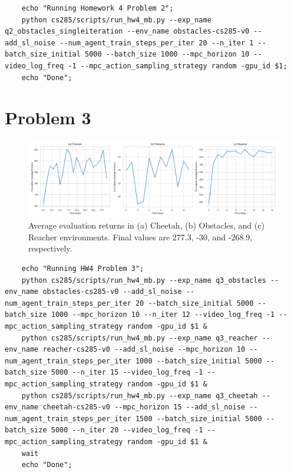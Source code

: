 \documentclass[10pt, letterpaper]{article}
\begin{document}
\begin{lstlisting}
    echo "Running Homework 4 Problem 2";
    python cs285/scripts/run_hw4_mb.py --exp_name q2_obstacles_singleiteration --env_name obstacles-cs285-v0 --add_sl_noise --num_agent_train_steps_per_iter 20 --n_iter 1 --batch_size_initial 5000 --batch_size 1000 --mpc_horizon 10 --video_log_freq -1 --mpc_action_sampling_strategy random -gpu_id $1;
    echo "Done";
\end{lstlisting}

\pagebreak
\section*{Problem 3}

\begin{figure}[thbp]
    \centering
    \includegraphics[width=\textwidth]{q3.png}
    \caption{Average evaluation returns in (a) Cheetah, (b) Obstacles, and (c) Reacher environments. Final values are 277.3, -30, and -268.9, respectively.}
\end{figure}

\begin{lstlisting}
    echo "Running HW4 Problem 3";
    python cs285/scripts/run_hw4_mb.py --exp_name q3_obstacles --env_name obstacles-cs285-v0 --add_sl_noise --num_agent_train_steps_per_iter 20 --batch_size_initial 5000 --batch_size 1000 --mpc_horizon 10 --n_iter 12 --video_log_freq -1 --mpc_action_sampling_strategy random -gpu_id $1 &
    python cs285/scripts/run_hw4_mb.py --exp_name q3_reacher --env_name reacher-cs285-v0 --add_sl_noise --mpc_horizon 10 --num_agent_train_steps_per_iter 1000 --batch_size_initial 5000 --batch_size 5000 --n_iter 15 --video_log_freq -1 --mpc_action_sampling_strategy random -gpu_id $1 &
    python cs285/scripts/run_hw4_mb.py --exp_name q3_cheetah --env_name cheetah-cs285-v0 --mpc_horizon 15 --add_sl_noise --num_agent_train_steps_per_iter 1500 --batch_size_initial 5000 --batch_size 5000 --n_iter 20 --video_log_freq -1 --mpc_action_sampling_strategy random -gpu_id $1 &
    wait
    echo "Done";
\end{lstlisting}
\end{document}
